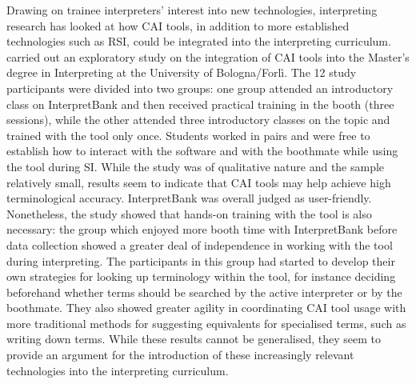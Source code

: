 Drawing on trainee interpreters' interest into new technologies, interpreting research has looked at how CAI tools, in addition to more established technologies such as RSI, could be integrated into the interpreting curriculum. \citet{prandi_uso_2015,prandi_use_2015} carried out an exploratory study on the integration of CAI tools into the Master's degree in Interpreting at the University of Bologna/Forlì. The 12 study participants were divided into two groups: one group attended an introductory class on InterpretBank and then received practical training in the booth (three sessions), while the other attended three introductory classes on the topic and trained with the tool only once. Students worked in pairs and were free to establish how to interact with the software and with the boothmate while using the tool during SI. While the study was of qualitative nature and the sample relatively small, results seem to indicate that CAI tools may help achieve high terminological accuracy. InterpretBank was overall judged as user-friendly. Nonetheless, the study showed that hands-on training with the tool is also necessary: the group which enjoyed more booth time with InterpretBank before data collection showed a greater deal of independence in working with the tool during interpreting. The participants in this group had started to develop their own strategies for looking up terminology within the tool, for instance deciding beforehand whether terms should be searched by the active interpreter or by the boothmate. They also showed greater agility in coordinating CAI tool usage with more traditional methods for suggesting equivalents for specialised terms, such as writing down terms. While these results cannot be generalised, they seem to provide an argument for the introduction of these increasingly relevant technologies into the interpreting curriculum.

